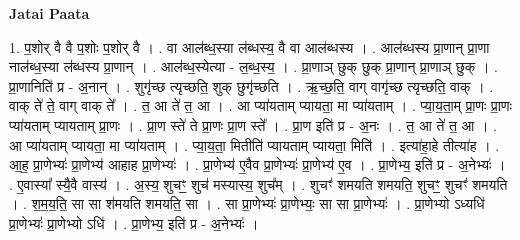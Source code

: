 \documentclass[17pt]{extarticle}
\begin{document}
\textbf{Jatai Paata} \newline

1. प॒शोर् वै वै प॒शोः प॒शोर् वै । . वा आल॑ब्ध॒स्या ल॑ब्धस्य॒ वै वा आल॑ब्धस्य । . आल॑ब्धस्य प्रा॒णान् प्रा॒णा नाल॑ब्ध॒स्या ल॑ब्धस्य प्रा॒णान् । . आल॑ब्ध॒स्येत्या - ल॒ब्ध॒स्य॒ । . प्रा॒णाञ् छुक् छुक् प्रा॒णान् प्रा॒णाञ् छुक् । . प्रा॒णानिति॑ प्र - अ॒नान् । . शुगृ॑च्छ त्यृच्छति॒ शुक् छुगृ॑च्छति । . ऋ॒च्छ॒ति॒ वाग् वागृ॑च्छ त्यृच्छति॒ वाक् । . वाक् ते॑ ते॒ वाग् वाक् ते᳚ । . त॒ आ ते॑ त॒ आ । . आ प्या॑यताम् प्यायता॒ मा प्या॑यताम् । . प्या॒य॒ता॒म् प्रा॒णः प्रा॒णः प्या॑यताम् प्यायताम् प्रा॒णः । . प्रा॒ण स्ते॑ ते प्रा॒णः प्रा॒ण स्ते᳚ । . प्रा॒ण इति॑ प्र - अ॒नः । . त॒ आ ते॑ त॒ आ । . आ प्या॑यताम् प्यायता॒ मा प्या॑यताम् । . प्या॒य॒ता॒ मितीति॑ प्यायताम् प्यायता॒ मिति॑ । . इत्या॑हा॒हे तीत्या॑ह । . आ॒ह॒ प्रा॒णेभ्यः॑ प्रा॒णेभ्य॑ आहाह प्रा॒णेभ्यः॑ । . प्रा॒णेभ्य॑ ए॒वैव प्रा॒णेभ्यः॑ प्रा॒णेभ्य॑ ए॒व । . प्रा॒णेभ्य॒ इति॑ प्र - अ॒नेभ्यः॑ । . ए॒वास्या᳚ स्यै॒वै वास्य॑ । . अ॒स्य॒ शुचꣳ॒॒ शुच॑ मस्यास्य॒ शुच᳚म् । . शुचꣳ॑ शमयति शमयति॒ शुचꣳ॒॒ शुचꣳ॑ शमयति । . श॒म॒य॒ति॒ सा सा श॑मयति शमयति॒ सा । . सा प्रा॒णेभ्यः॑ प्रा॒णेभ्यः॒ सा सा प्रा॒णेभ्यः॑ । . प्रा॒णेभ्यो ऽध्यधि॑ प्रा॒णेभ्यः॑ प्रा॒णेभ्यो ऽधि॑ । . प्रा॒णेभ्य॒ इति॑ प्र - अ॒नेभ्यः॑ । \newline
\end{document}
